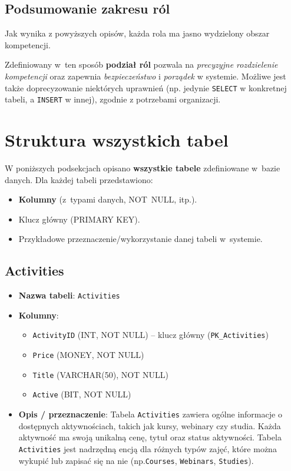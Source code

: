 \documentclass[12pt]{article}
\begin{document}
\subsection{Podsumowanie zakresu ról}
Jak wynika z powyższych opisów, każda rola ma jasno wydzielony obszar kompetencji.

\noindent Zdefiniowany w~ten sposób \textbf{podział ról} pozwala na \emph{precyzyjne rozdzielenie kompetencji} oraz zapewnia \emph{bezpieczeństwo} i \emph{porządek} w systemie. Możliwe jest także doprecyzowanie niektórych uprawnień (np. jedynie \texttt{SELECT} w konkretnej tabeli, a \texttt{INSERT} w innej), zgodnie z potrzebami organizacji.


\newpage
\section{Struktura wszystkich tabel}

W poniższych podsekcjach opisano \textbf{wszystkie tabele} zdefiniowane w~bazie danych.  
Dla każdej tabeli przedstawiono:

\begin{itemize}
  \item \textbf{Kolumny} (z~typami danych, NOT~NULL, itp.).
  \item Klucz główny (PRIMARY KEY).
  \item Przykładowe przeznaczenie/wykorzystanie danej tabeli w~systemie.
\end{itemize}

\vspace{1em}

\subsection{Activities}
\begin{itemize}
    \item \textbf{Nazwa tabeli}: \texttt{Activities}
    \item \textbf{Kolumny}:
          \begin{itemize}
            \item \texttt{ActivityID} (INT, NOT NULL) -- klucz główny (\texttt{PK\_Activities})
            \item \texttt{Price} (MONEY, NOT NULL)
            \item \texttt{Title} (VARCHAR(50), NOT NULL)
            \item \texttt{Active} (BIT, NOT NULL)
          \end{itemize}
    \item \textbf{Opis / przeznaczenie}:  
          Tabela \texttt{Activities} zawiera ogólne informacje o dostępnych aktywnościach, takich jak kursy, webinary czy studia. Każda aktywność ma swoją unikalną cenę, tytuł oraz status aktywności. Tabela \texttt{Activities} jest nadrzędną encją dla różnych typów zajęć, które można wykupić lub zapisać się na nie (np.\texttt{Courses}, \texttt{Webinars}, \texttt{Studies}).
\end{itemize}
\end{document}
